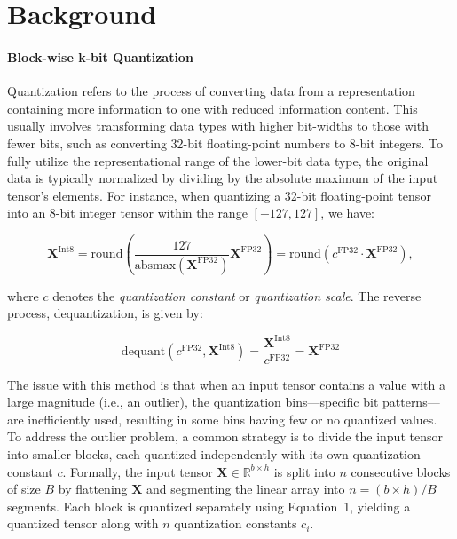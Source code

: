 \section{Background}
\paragraph{Block-wise k-bit Quantization} Quantization refers to the process of converting data from a representation containing more information to one with reduced information content. This usually involves transforming data types with higher bit-widths to those with fewer bits, such as converting 32-bit floating-point numbers to 8-bit integers. To fully utilize the representational range of the lower-bit data type, the original data is typically normalized by dividing by the absolute maximum of the input tensor's elements. For instance, when quantizing a 32-bit floating-point tensor into an 8-bit integer tensor within the range $[-127, 127]$, we have:

\begin{equation}
    \mathbf{X}^{ \text{Int8}} = \text{round}\left( \frac{127}{{\text{absmax}}(\mathbf{X}^{{\text{FP32}}})}\mathbf{X}^{{\text{FP32}}} \right) = \text{round}(c^{\text{FP32}}\cdot \mathbf{X}^{{\text{FP32}}}),
\end{equation}

where $c$ denotes the {\em quantization constant} or {\em quantization scale}. The reverse process, dequantization, is given by:

\begin{equation}
    \text{dequant}(c^{\text{FP32}}, \mathbf{X}^{\text{Int8}}) = \frac{\mathbf{X}^{\text{Int8}}}{c^{\text{FP32}}} = \mathbf{X}^{\text{FP32}}
\end{equation}

The issue with this method is that when an input tensor contains a value with a large magnitude (i.e., an outlier), the quantization bins—specific bit patterns—are inefficiently used, resulting in some bins having few or no quantized values. To address the outlier problem, a common strategy is to divide the input tensor into smaller blocks, each quantized independently with its own quantization constant $c$. Formally, the input tensor $\mathbf{X}\in \mathbb{R}^{b\times h}$ is split into $n$ consecutive blocks of size $B$ by flattening $\mathbf{X}$ and segmenting the linear array into ${n = ({b\times h} )/{B} }$ segments. Each block is quantized separately using Equation~1, yielding a quantized tensor along with $n$ quantization constants $c_i$.


